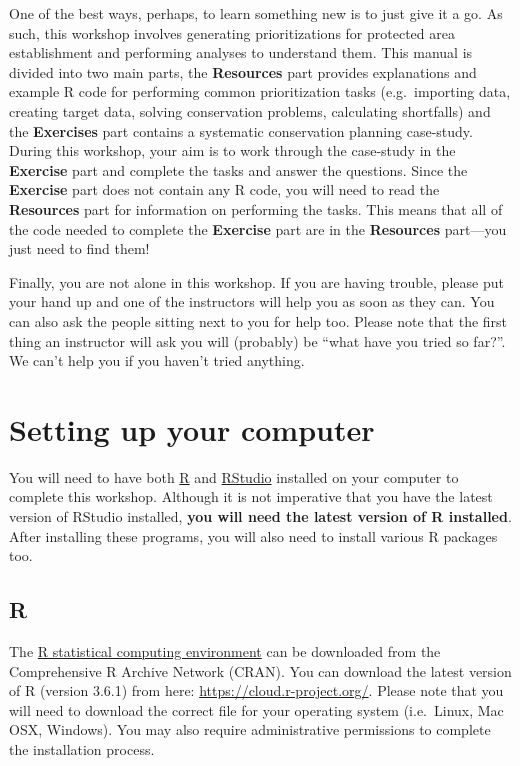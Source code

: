\documentclass[]{book}
\begin{document}
One of the best ways, perhaps, to learn something new is to just give it
a go. As such, this workshop involves generating prioritizations for
protected area establishment and performing analyses to understand them.
This manual is divided into two main parts, the \textbf{Resources} part
provides explanations and example R code for performing common
prioritization tasks (e.g.~importing data, creating target data, solving
conservation problems, calculating shortfalls) and the
\textbf{Exercises} part contains a systematic conservation planning
case-study. During this workshop, your aim is to work through the
case-study in the \textbf{Exercise} part and complete the tasks and
answer the questions. Since the \textbf{Exercise} part does not contain
any R code, you will need to read the \textbf{Resources} part for
information on performing the tasks. This means that all of the code
needed to complete the \textbf{Exercise} part are in the
\textbf{Resources} part---you just need to find them!

Finally, you are not alone in this workshop. If you are having trouble,
please put your hand up and one of the instructors will help you as soon
as they can. You can also ask the people sitting next to you for help
too. Please note that the first thing an instructor will ask you will
(probably) be ``what have you tried so far?''. We can't help you if you
haven't tried anything.

\section{Setting up your computer}\label{setting-up-your-computer}

You will need to have both \href{https://www.r-project.org/}{R} and
\href{https://www.rstudio.com/}{RStudio} installed on your computer to
complete this workshop. Although it is not imperative that you have the
latest version of RStudio installed, \textbf{you will need the latest
version of R installed}. After installing these programs, you will also
need to install various R packages too.

\subsection{R}\label{r}

The \href{https://www.r-project.org/}{R statistical computing
environment} can be downloaded from the Comprehensive R Archive Network
(CRAN). You can download the latest version of R (version 3.6.1) from
here: \url{https://cloud.r-project.org/}. Please note that you will need
to download the correct file for your operating system (i.e.~Linux, Mac
OSX, Windows). You may also require administrative permissions to
complete the installation process.
\end{document}

